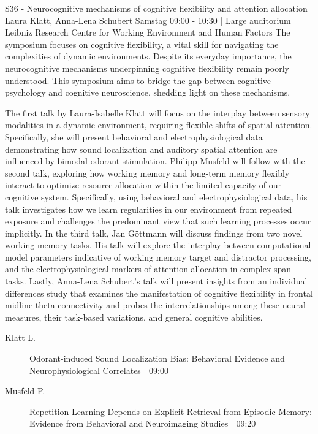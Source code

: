 
            \begin{symposium}
            {S36 - Neurocognitive mechanisms of cognitive flexibility and attention allocation }
            {Laura Klatt, Anna-Lena Schubert}
            {Samstag 09:00 - 10:30 | Large auditorium}
            {Leibniz Research Centre for Working Environment and Human Factors}
            The symposium focuses on cognitive flexibility, a vital skill for navigating the complexities of dynamic environments. Despite its everyday importance, the neurocognitive mechanisms underpinning cognitive flexibility remain poorly understood. This symposium aims to bridge the gap between cognitive psychology and cognitive neuroscience, shedding light on these mechanisms.

The first talk by Laura-Isabelle Klatt will focus on the interplay between sensory modalities in a dynamic environment, requiring flexible shifts of spatial attention. Specifically, she will present behavioral and electrophysiological data demonstrating how sound localization and auditory spatial attention are influenced by bimodal odorant stimulation. Philipp Musfeld will follow with the second talk, exploring how working memory and long-term memory flexibly interact to optimize resource allocation within the limited capacity of our cognitive system. Specifically, using behavioral and electrophysiological data, his talk investigates how we learn regularities in our environment from repeated exposure and challenges the predominant view that such learning processes occur implicitly. In the third talk, Jan Göttmann will discuss findings from two novel working memory tasks. His talk will explore the interplay between computational model parameters indicative of working memory target and distractor processing, and the electrophysiological markers of attention allocation in complex span tasks. Lastly, Anna-Lena Schubert's talk will present insights from an individual differences study that examines the manifestation of cognitive flexibility in frontal midline theta connectivity and probes the interrelationships among these neural measures, their task-based variations, and general cognitive abilities.
            \begin{description}    
            
                \item [ Klatt L.] Odorant-induced Sound Localization Bias: Behavioral Evidence and Neurophysiological Correlates \textcolor{mygray}{ | 09:00}    
                
                \item [ Musfeld P.] Repetition Learning Depends on Explicit Retrieval from Episodic Memory: Evidence from Behavioral and Neuroimaging Studies \textcolor{mygray}{ | 09:20}    
                

\end{description}
\end{symposium}
